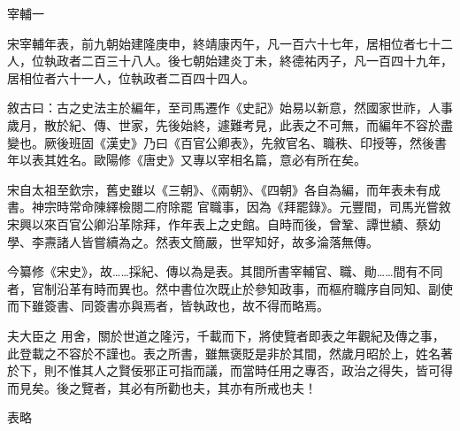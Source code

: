 
\begin{pinyinscope}

 宰輔一



 宋宰輔年表，前九朝始建隆庚申，終靖康丙午，凡一百六十七年，居相位者七十二人，位執政者二百三十八人。後七朝始建炎丁未，終德祐丙子，凡一百四十九年，
 居相位者六十一人，位執政者二百四十四人。



 敘古曰：古之史法主於編年，至司馬遷作《史記》始易以新意，然國家世祚，人事歲月，散於紀、傳、世家，先後始終，遽難考見，此表之不可無，而編年不容於盡變也。厥後班固《漢史》乃曰《百官公卿表》，先敘官名、職秩、印授等，然後書年以表其姓名。歐陽修《唐史》又專以宰相名篇，意必有所在矣。



 宋自太祖至欽宗，舊史雖以《三朝》、《兩朝》、《四朝》各自為編，而年表未有成書。神宗時常命陳繹檢閱二府除罷
 官職事，因為《拜罷錄》。元豐間，司馬光嘗敘宋興以來百官公卿沿革除拜，作年表上之史館。自時而後，曾鞏、譚世績、蔡幼學、李燾諸人皆嘗續為之。然表文簡嚴，世罕知好，故多淪落無傳。



 今纂修《宋史》，故……採紀、傳以為是表。其間所書宰輔官、職、勛……間有不同者，官制沿革有時而異也。然中書位次既止於參知政事，而樞府職序自同知、副使而下雖簽書、同簽書亦與焉者，皆執政也，故不得而略焉。



 夫大臣之
 用舍，關於世道之隆污，千載而下，將使覽者即表之年觀紀及傳之事，此登載之不容於不謹也。表之所書，雖無褒貶是非於其間，然歲月昭於上，姓名著於下，則不惟其人之賢佞邪正可指而議，而當時任用之專否，政治之得失，皆可得而見矣。後之覽者，其必有所勸也夫，其亦有所戒也夫！



 表略



\end{pinyinscope}